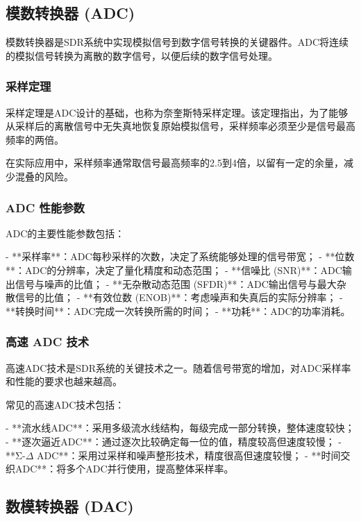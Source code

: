 ﻿\documentclass[UTF8]{ctexbook}
\begin{document}
\subsection{模数转换器 (ADC)}

模数转换器是SDR系统中实现模拟信号到数字信号转换的关键器件。ADC将连续的模拟信号转换为离散的数字信号，以便后续的数字信号处理。

\subsubsection{采样定理}

采样定理是ADC设计的基础，也称为奈奎斯特采样定理。该定理指出，为了能够从采样后的离散信号中无失真地恢复原始模拟信号，采样频率必须至少是信号最高频率的两倍。

在实际应用中，采样频率通常取信号最高频率的2.5到4倍，以留有一定的余量，减少混叠的风险。

\subsubsection{ADC 性能参数}

ADC的主要性能参数包括：

- **采样率**：ADC每秒采样的次数，决定了系统能够处理的信号带宽；
- **位数**：ADC的分辨率，决定了量化精度和动态范围；
- **信噪比 (SNR)**：ADC输出信号与噪声的比值；
- **无杂散动态范围 (SFDR)**：ADC输出信号与最大杂散信号的比值；
- **有效位数 (ENOB)**：考虑噪声和失真后的实际分辨率；
- **转换时间**：ADC完成一次转换所需的时间；
- **功耗**：ADC的功率消耗。

\subsubsection{高速 ADC 技术}

高速ADC技术是SDR系统的关键技术之一。随着信号带宽的增加，对ADC采样率和性能的要求也越来越高。

常见的高速ADC技术包括：

- **流水线ADC**：采用多级流水线结构，每级完成一部分转换，整体速度较快；
- **逐次逼近ADC**：通过逐次比较确定每一位的值，精度较高但速度较慢；
- **Σ-\(\Delta\) ADC**：采用过采样和噪声整形技术，精度很高但速度较慢；
- **时间交织ADC**：将多个ADC并行使用，提高整体采样率。

\subsection{数模转换器 (DAC)}
\end{document}
